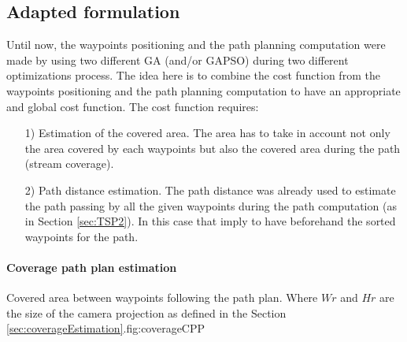 		\subsection{Adapted formulation }
Until now, the waypoints positioning and the path planning computation were made by using two different GA (and/or GAPSO) during two different optimizations process. The idea here is to combine the cost function from the waypoints positioning and the path planning computation to have an appropriate and global cost function.
The cost function requires:
\begin{itemize}
	\item[1)] Estimation of the covered area. The area has to take in account not only the area covered by each waypoints but also the covered area during the path (stream coverage).%
	\item[2)] Path distance estimation. The path distance was already used to estimate the path passing  by all the given waypoints during the path computation (as in Section \ref{sec:TSP2}). In this case that imply to have beforehand the sorted waypoints for the path.
\end{itemize}

\paragraph*{Coverage path plan estimation}\label{par:CPPestimation}

  \begin{mfigures}[!]{Covered area between waypoints following the path plan. Where $Wr$ and $Hr$ are the size of the camera projection  as defined in the Section \ref{sec:coverageEstimation}.}{fig:coverageCPP} \centering

\end{mfigures}  



